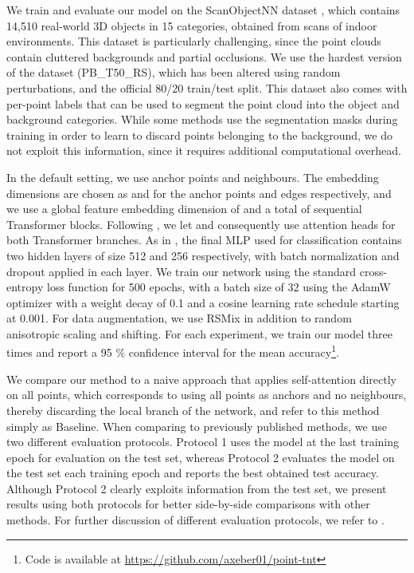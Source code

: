 \documentclass[a4paper,conference]{IEEEtran}
\begin{document}
We train and evaluate our model on the ScanObjectNN dataset \cite{uy2019revisiting}, which contains 14,510 real-world 3D objects in 15 categories, obtained from scans of indoor environments. This dataset is particularly challenging, since the point clouds contain cluttered backgrounds and partial occlusions. We use the hardest version of the dataset (PB\_T50\_RS), which has been altered using random perturbations, and the official 80/20 train/test split. This dataset also comes with per-point labels that can be used to segment the point cloud into the object and background categories. While some methods use the segmentation masks during training in order to learn to discard points belonging to the background, we do not exploit this information, since it requires additional computational overhead.

In the default setting, we use  anchor points and  neighbours. The embedding dimensions are chosen as  and  for the anchor points and edges respectively, and we use a global feature embedding dimension of  and a total of  sequential Transformer blocks. Following \cite{touvron2021training}, we let  and consequently use  attention heads for both Transformer branches. As in \cite{wang2019dynamic}, the final MLP used for classification contains two hidden layers of size 512 and 256 respectively, with batch normalization and dropout applied in each layer. We train our network using the standard cross-entropy loss function for 500 epochs, with a batch size of 32 using the AdamW optimizer \cite{loshchilov2018decoupled} with a weight decay of 0.1 and a cosine learning rate schedule starting at 0.001. For data augmentation, we use RSMix \cite{lee2021regularization} in addition to random anisotropic scaling and shifting. For each experiment, we train our model three times and report a 95 \% confidence interval for the mean accuracy\footnote{Code is available at \url{https://github.com/axeber01/point-tnt}}. 

We compare our method to a naive approach that applies self-attention directly on all points, which corresponds to using all points as anchors and no neighbours, thereby discarding the local branch of the network, and refer to this method simply as Baseline. When comparing to previously published methods, we use two different evaluation protocols. Protocol 1 uses the model at the last training epoch for evaluation on the test set, whereas Protocol 2 evaluates the model on the test set each training epoch and reports the best obtained test accuracy. Although Protocol 2 clearly exploits information from the test set, we present results using both protocols for better side-by-side comparisons with other methods. For further discussion of different evaluation protocols, we refer to \cite{goyal2021revisiting}.
\end{document}
